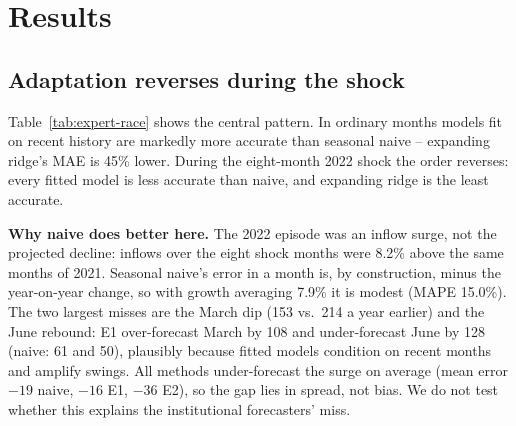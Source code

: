 \documentclass[runningheads]{llncs}
\begin{document}
\section{Results}
\label{sec:results}

\subsection{Adaptation reverses during the shock}

\begin{table}[t]
\centering
\caption{MAE (million USD) by evaluation window. Ordinary = Main minus Shock; Shock is a subset of
Main; Full is the weighted average of Main and Transition.}
\label{tab:expert-race}
\end{table}

Table~\ref{tab:expert-race} shows the central pattern. In ordinary months models fit on recent
history are markedly more accurate than seasonal naive -- expanding ridge's MAE is 45\% lower. During
the eight-month 2022 shock the order reverses: every fitted model is less accurate than naive, and
expanding ridge is the least accurate.

\textbf{Why naive does better here.} The 2022 episode was an inflow surge, not the projected
decline: inflows over the eight shock months were 8.2\% above the same months of 2021. Seasonal
naive's error in a month is, by construction, minus the year-on-year change, so with growth
averaging 7.9\% it is modest (MAPE 15.0\%). The two largest misses are the March dip (153 vs.\ 214 a
year earlier) and the June rebound: E1 over-forecast March by 108 and under-forecast June by 128
(naive: 61 and 50), plausibly because fitted models condition on recent months and amplify swings.
All methods under-forecast the surge on average (mean error $-19$ naive, $-16$ E1, $-36$ E2), so the
gap lies in spread, not bias. We do not test whether this explains the institutional forecasters' miss.
\end{document}

